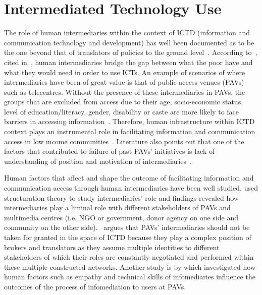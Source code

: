 \section{Intermediated Technology Use}
The role of human intermediaries within the context of ICTD (information and communication technology and development) has well been documented as to be the one beyond that of translators of policies to the ground level~\citep{bailur2010liminal}. According to~\cite{heeks1999tyranny}, cited in~\cite{bailur2012complex}, human intermediaries bridge the gap between what the poor have and what they would need in order to use ICTs. An example of  scenarios of where intermediaries have been of great value is that of public access venues (PAVs) such as telecentres. Without the presence of these intermediaries in PAVs, the groups that are excluded from access due to their age, socio-economic status, level of education/literacy, gender, disability or caste are more likely to face barriers in accessing information~\citep{ramirez2013infomediaries}. Therefore, human infrastructure within ICTD context plays an instrumental role in facilitating information and communication access in low income communities~\citep{sambasivan2010human}.
Literature also points out that one of the factors that contributed to failure of past PAVs' initiatives is lack of understanding of position and motivation of intermediaries~\citep{bailur2010liminal}.
 
Human factors that affect and shape the outcome of facilitating information and communication access through human intermediaries have been well studied. \cite{bailur2010liminal} used structuration theory\citep{jones2008giddens} to study intermediaries' role and findings revealed how intermediaries play a liminal role with different stakeholders of PAVs and multimedia centres (i.e. NGO or government, donor agency on one side and community on the other side).~\cite{bailur2012complex} argues that PAVs' intermediaries should not be taken for granted in the space of ICTD because they play a complex position of brokers and translators as they assume multiple identities to different stakeholders of which their roles are constantly negotiated and performed within these multiple constructed networks. Another study is by \cite{ramirez2013infomediaries} which investigated how human factors such as empathy and technical skills of infomediaries influence the outcomes of the process of infomediation to users at PAVs. 

